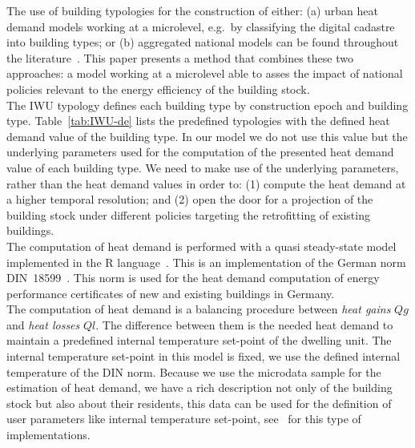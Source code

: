 \documentclass[runningheads,a4paper]{llncs}
\begin{document}
The use of building typologies for the construction of either: (a) urban heat
demand models working at a microlevel, e.g.\ by classifying the digital
cadastre into building types; or (b) aggregated national models can be found
throughout the
literature~\cite{Caputo.2013,Hrabovszky.2013,Kragh.2013,Singh.2013,DallO.2012,Dascalaki.2011,Balaras.2007}.
This paper presents a method that combines these two approaches: a model working at
a microlevel able to asses the impact of national policies relevant to the
energy efficiency of the building stock.
\\

The IWU typology defines each building type by construction epoch and building
type. Table~\ref{tab:IWU-de} lists the predefined typologies with the defined
heat demand value of the building type. In our model we do not use this value
but the underlying parameters used for the computation of the presented heat
demand value of each building type.
We need to make use of the underlying parameters, rather than the heat demand
values in order to: (1) compute the heat demand at a higher temporal
resolution; and (2) open the door for a projection of the building stock under
different policies targeting the retrofitting of existing buildings.
\\



The computation of heat demand is performed with a quasi steady-state model
implemented in the R language~\cite{MunozH.2015.heat}. This is an
implementation of the German norm DIN~18599~\cite{DIN.18599.V}.
This norm is used for the heat demand computation of energy performance
certificates of new and existing buildings in Germany.
\\

The computation of heat demand is a balancing procedure between \textit{heat gains}
$Qg$ and \textit{heat losses} $Ql$. The difference between them is the needed
heat demand to maintain a predefined internal temperature set-point of the dwelling unit.
The internal temperature set-point in this model is fixed, we use the defined internal
temperature of the DIN norm. Because we use the microdata sample for the estimation of
heat demand, we have a rich description not only of the building stock but also
about their residents, this data can be used for the definition of user
parameters like internal temperature set-point,
see~\cite{MunozH.2014.IBPSA-JP,MunozH.2015.IBPSA.Pop} for this type of
implementations.
\\
\end{document}
